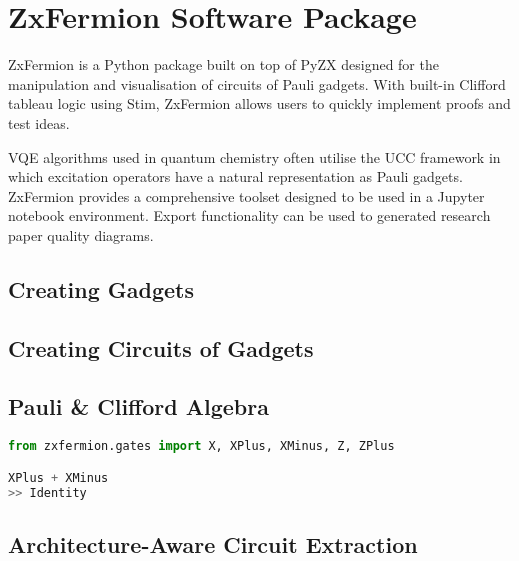 \section{ZxFermion Software Package}

ZxFermion is a Python package built on top of PyZX designed for the manipulation and visualisation of circuits of Pauli gadgets. With built-in Clifford tableau logic using Stim, ZxFermion allows users to quickly implement proofs and test ideas.

VQE algorithms used in quantum chemistry often utilise the UCC framework in which excitation operators have a natural representation as Pauli gadgets. ZxFermion provides a comprehensive toolset designed to be used in a Jupyter notebook environment. Export functionality can be used to generated research paper quality diagrams.

\subsection{Creating Gadgets}
\subsection{Creating Circuits of Gadgets}
\subsection{Pauli \& Clifford Algebra}
\begin{lstlisting}[language=Python]
from zxfermion.gates import X, XPlus, XMinus, Z, ZPlus

XPlus + XMinus
>> Identity
\end{lstlisting}

\subsection{Architecture-Aware Circuit Extraction}

